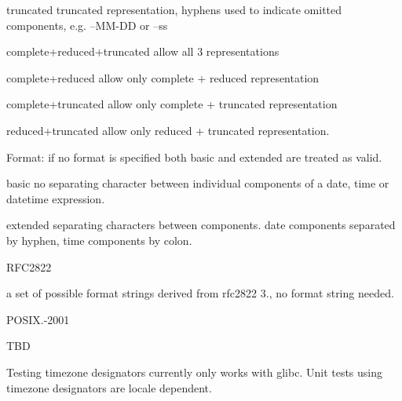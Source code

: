 \begin{DoxyItemize}
\begin{DoxyItemize}
\begin{DoxyItemize}
\item {\ttfamily truncated} truncated representation, hyphens used to indicate omitted components, e.\+g. --M\+M-\/\+DD or --ss
\item {\ttfamily complete+reduced+truncated} allow all 3 representations
\item {\ttfamily complete+reduced} allow only {\ttfamily complete} + {\ttfamily reduced} representation
\item {\ttfamily complete+truncated} allow only {\ttfamily complete} + {\ttfamily truncated} representation
\item {\ttfamily reduced+truncated} allow only {\ttfamily reduced} + {\ttfamily truncated} representation.
\end{DoxyItemize}
\item Format\+: if no format is specified both {\ttfamily basic} and {\ttfamily extended} are treated as valid.
\begin{DoxyItemize}
\item {\ttfamily basic} no separating character between individual components of a {\ttfamily date}, {\ttfamily time} or {\ttfamily datetime} expression.
\item {\ttfamily extended} separating characters between components. {\ttfamily date} components separated by hyphen, {\ttfamily time} components by colon.
\end{DoxyItemize}
\end{DoxyItemize}
\item {\ttfamily R\+F\+C2822}

a set of possible format strings derived from rfc2822 3., no format string needed.
\end{DoxyItemize}

P\+O\+S\+I\+X.-\/2001

T\+BD

Testing timezone designators currently only works with glibc. Unit tests using timezone designators are locale dependent. 